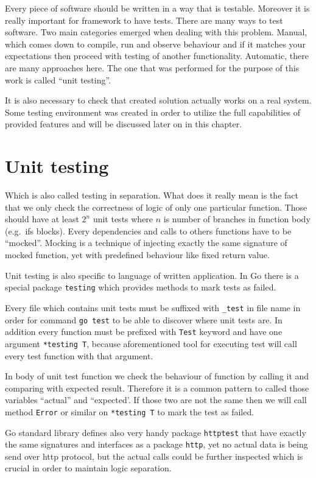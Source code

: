Every piece of software should be written in a way that is testable. Moreover
it is really important for framework to have tests. There are many ways to test
software. Two main categories emerged when dealing with this problem. Manual,
which comes down to compile, run and observe behaviour and if it matches your
expectations then proceed with testing of another functionality. Automatic,
there are many approaches here. The one that was performed for the purpose of
this work is called ``unit testing''.

It is also necessary to check that created solution actually works on a real
system. Some testing environment was created in order to utilize the full
capabilities of provided features and will be discussed later on in this
chapter.

\section{Unit testing}
Which is also called testing in separation. What does it really mean is the
fact that we only check the correctness of logic of only one particular
function. Those should have at least $2^n$ unit tests where $n$ is number of
branches in function body (e.g.\ ifs blocks). Every dependencies and calls to
others functions have to be ``mocked''. Mocking is a technique of injecting
exactly the same signature of mocked function, yet with predefined behaviour
like fixed return value.

Unit testing is also specific to language of written application. In Go there
is a special package \verb|testing| which provides methods to mark tests as
failed.

Every file which contains unit tests must be suffixed with \verb|_test| in file
name\cite{Testing-go} in order for command \verb|go test| to be able to
discover where unit tests are. In addition every function must be prefixed with
\verb|Test| keyword and have one argument \verb|*testing T|, because
aforementioned tool for executing test will call every test function with that
argument.

In body of unit test function we check the behaviour of function by calling it
and comparing with expected result. Therefore it is a common pattern to called
those variables ``actual'' and ``expected'. If those two are not the same then
we will call method \verb|Error| or similar on \verb|*testing T| to mark the
test as failed.

Go standard library defines also very handy package
\verb|httptest|\cite{httptest-go} that have exactly the same signatures and
interfaces as a package \verb|http|, yet no actual data is being send over http
protocol, but the actual calls could be further inspected which is crucial in
order to maintain logic separation.

